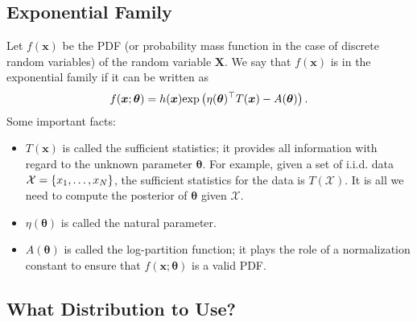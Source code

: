     \subsection{Exponential Family}
        Let $f(\bm{x})$ be the PDF (or probability mass function in the case of discrete random variables) of the random variable $\bm{X}$.
        We say that $f(\bm{x})$ is in the exponential family if it can be written as
            \begin{equation}
                f(\bm{x}; \bm{\theta}) = h(\bm{x})   \text{exp}\left( \eta(\bm{\theta})^\top T(\bm{x}) - A(\bm{\theta}) \right) .
            \end{equation}
        Some important facts:
            \begin{itemize}
                \item $T(\bm{x})$ is called the sufficient statistics; it provides all information with regard to the unknown parameter $\bm{\theta}$. 
                For example, given a set of i.i.d. data $\mathcal{X}=\{ x_1, \ldots, x_N \}$, the sufficient statistics for the data is $T(\mathcal{X})$. It is all we need to compute the posterior of $\bm{\theta}$ given $\mathcal{X}$.
                \item $\eta(\bm{\theta})$ is called the natural parameter.
                \item $A(\bm{\theta})$ is called the log-partition function; it plays the role of a normalization constant to ensure that $f(\bm{x}; \bm{\theta})$ is a valid PDF.
            \end{itemize}

    \subsection{What Distribution to Use?}
        
    